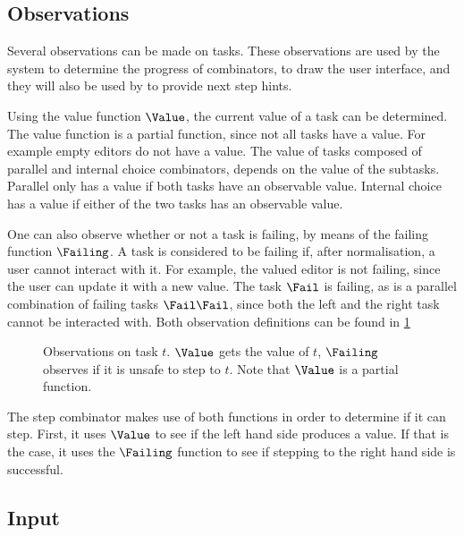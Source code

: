 \subsection{Observations}

Several observations can be made on tasks.
These observations are used by the system to determine the progress of combinators,
to draw the user interface, and they will also be used by \ASTOPHAT to provide next step hints.

Using the value function $\Value$, the current value of a task can be determined.
The value function is a partial function, since not all tasks have a value.
For example empty editors do not have a value.
The value of tasks composed of parallel and internal choice combinators, depends on the value of the subtasks.
Parallel only has a value if both tasks have an observable value.
Internal choice has a value if either of the two tasks has an observable value.

One can also observe whether or not a task is failing, by means of the failing function $\Failing$.
A task is considered to be failing if, after normalisation, a user cannot interact with it.
For example, the valued editor is not failing, since the user can update it with a new value.
The task $\Fail$ is failing, as is a parallel combination of failing tasks $\Fail \And \Fail$, since both the left and the right task cannot be interacted with.
Both observation definitions can be found in \cref{fig:observations}

\begin{figure}[h]
  \begin{minipage}{\textwidth}
    \centering \small
      
  \end{minipage}
  \caption{
    Observations on task $t$.
    $\Value$ gets the value of $t$, $\Failing$ observes if it is unsafe to step to $t$.
    Note that $\Value$ is a partial function.
  }
  \label{fig:observations}
\end{figure}

The step combinator makes use of both functions in order to determine if it can step.
First, it uses $\Value$ to see if the left hand side produces a value.
If that is the case, it uses the $\Failing$ function to see if stepping to the right hand side is successful.


\subsection{Input}


